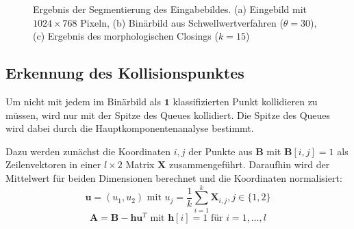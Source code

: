 \begin{figure}[H]
	\label{fig:thresholded}
	\centering
	\caption{Ergebnis der Segmentierung des Eingabebildes. (a) Eingebild mit $1024 \times 768$ Pixeln, (b) Binärbild aus Schwellwertverfahren ($\theta = 30$),  (c) Ergebnis des morphologischen Closings ($k=15$)}
\end{figure}

\subsection{Erkennung des Kollisionspunktes}
Um nicht mit jedem im Binärbild als $\textbf{1}$ klassifizierten Punkt kollidieren zu müssen, wird nur mit der Spitze des Queues kollidiert.
Die Spitze des Queues wird dabei durch die Hauptkomponentenanalyse bestimmt.

Dazu werden zunächst die Koordinaten $i, j$ der Punkte aus $\textbf{B}$ mit $\textbf{B}[i,j] = 1$ als Zeilenvektoren in einer $l \times 2$ Matrix $\textbf{X}$ zusammengeführt.
Daraufhin wird der Mittelwert für beiden Dimensionen berechnet und die Koordinaten normalisiert:
\begin{equation*}
\textbf{u} = (u_1, u_2)\text{ mit }u_j = \frac{1}{k}\sum_{i=1}^{k}\textbf{X}_{i, j}, j \in \{1,2\}
\end{equation*}
\begin{equation*}
\textbf{A} = \textbf{B} - \textbf{h}\textbf{u}^T \text{ mit } \textbf{h}[i] = 1 \text{ für } i=1,\dots,l
\end{equation*}



